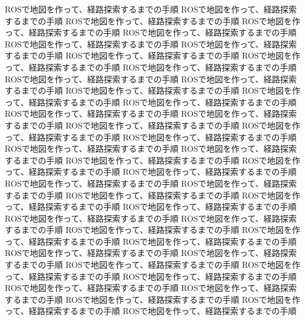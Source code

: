 ROSで地図を作って、経路探索するまでの手順
ROSで地図を作って、経路探索するまでの手順
ROSで地図を作って、経路探索するまでの手順
ROSで地図を作って、経路探索するまでの手順
ROSで地図を作って、経路探索するまでの手順
ROSで地図を作って、経路探索するまでの手順
ROSで地図を作って、経路探索するまでの手順
ROSで地図を作って、経路探索するまでの手順
ROSで地図を作って、経路探索するまでの手順
ROSで地図を作って、経路探索するまでの手順
ROSで地図を作って、経路探索するまでの手順
ROSで地図を作って、経路探索するまでの手順
ROSで地図を作って、経路探索するまでの手順
ROSで地図を作って、経路探索するまでの手順
ROSで地図を作って、経路探索するまでの手順
ROSで地図を作って、経路探索するまでの手順
ROSで地図を作って、経路探索するまでの手順
ROSで地図を作って、経路探索するまでの手順
ROSで地図を作って、経路探索するまでの手順
ROSで地図を作って、経路探索するまでの手順
ROSで地図を作って、経路探索するまでの手順
ROSで地図を作って、経路探索するまでの手順
ROSで地図を作って、経路探索するまでの手順
ROSで地図を作って、経路探索するまでの手順
ROSで地図を作って、経路探索するまでの手順
ROSで地図を作って、経路探索するまでの手順
ROSで地図を作って、経路探索するまでの手順
ROSで地図を作って、経路探索するまでの手順
ROSで地図を作って、経路探索するまでの手順
ROSで地図を作って、経路探索するまでの手順
ROSで地図を作って、経路探索するまでの手順
ROSで地図を作って、経路探索するまでの手順
ROSで地図を作って、経路探索するまでの手順
ROSで地図を作って、経路探索するまでの手順
ROSで地図を作って、経路探索するまでの手順
ROSで地図を作って、経路探索するまでの手順
ROSで地図を作って、経路探索するまでの手順
ROSで地図を作って、経路探索するまでの手順
ROSで地図を作って、経路探索するまでの手順
ROSで地図を作って、経路探索するまでの手順
ROSで地図を作って、経路探索するまでの手順
ROSで地図を作って、経路探索するまでの手順
ROSで地図を作って、経路探索するまでの手順
ROSで地図を作って、経路探索するまでの手順
ROSで地図を作って、経路探索するまでの手順


%


